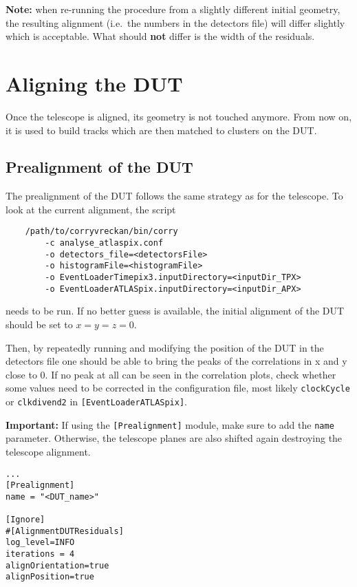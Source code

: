 \textbf{Note:} when re-running the procedure from a slightly different initial geometry, the resulting alignment (i.e.~the numbers in the detectors file) will differ slightly which is acceptable. What should \textbf{not} differ is the width of the residuals.


\section{Aligning the DUT}
\label{sec:align_dut}
Once the telescope is aligned, its geometry is not touched anymore. From now on, it is used to build tracks which are then matched to clusters on the DUT.

\subsection*{Prealignment of the DUT}
The prealignment of the DUT follows the same strategy as for the telescope. To look at the current alignment, the script
\begin{verbatim}
    /path/to/corryvreckan/bin/corry 
    	-c analyse_atlaspix.conf 
    	-o detectors_file=<detectorsFile> 
    	-o histogramFile=<histogramFile> 
    	-o EventLoaderTimepix3.inputDirectory=<inputDir_TPX>
    	-o EventLoaderATLASpix.inputDirectory=<inputDir_APX>
\end{verbatim}
needs to be run.
If no better guess is available, the initial alignment of the DUT should be set to $x=y=z=0$.

Then, by repeatedly running \corry and modifying the position of the DUT in the detectors file one should be able to bring the peaks of the correlations in x and y close to 0.
If no peak at all can be seen in the correlation plots, check whether some values need to be corrected in the configuration file, most likely \texttt{clockCycle} or \texttt{clkdivend2} in \texttt{[EventLoaderATLASpix]}.

\textbf{Important: }If using the \texttt{[Prealignment]} module, make sure to add the \texttt{name} parameter.
Otherwise, the telescope planes are also shifted again destroying the telescope alignment.

\begin{verbatim}
...
[Prealignment]
name = "<DUT_name>"

[Ignore]
#[AlignmentDUTResiduals]
log_level=INFO
iterations = 4
alignOrientation=true
alignPosition=true
\end{verbatim}

